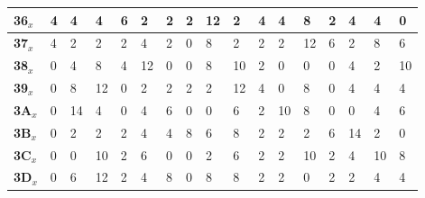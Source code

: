 \begin{longtable}[c]{|l|l|l|l|l|l|l|l|l|l|l|l|l|l|l|l|l|}
\textbf{36$_x$} & 4              & 4              & 4              & 6              & 2              & 2              & 2              & 12             & 2              & 4              & 4              & 8              & 2              & 4              & 4              & 0              \\ \hline
\textbf{37$_x$} & 4              & 2              & 2              & 2              & 4              & 2              & 0              & 8              & 2              & 2              & 2              & 12             & 6              & 2              & 8              & 6              \\ \hline
\textbf{38$_x$} & 0              & 4              & 8              & 4              & 12             & 0              & 0              & 8              & 10             & 2              & 0              & 0              & 0              & 4              & 2              & 10             \\ \hline
\textbf{39$_x$} & 0              & 8              & 12             & 0              & 2              & 2              & 2              & 2              & 12             & 4              & 0              & 8              & 0              & 4              & 4              & 4              \\ \hline
\textbf{3A$_x$} & 0              & 14             & 4              & 0              & 4              & 6              & 0              & 0              & 6              & 2              & 10             & 8              & 0              & 0              & 4              & 6              \\ \hline
\textbf{3B$_x$} & 0              & 2              & 2              & 2              & 4              & 4              & 8              & 6              & 8              & 2              & 2              & 2              & 6              & 14             & 2              & 0              \\ \hline
\textbf{3C$_x$} & 0              & 0              & 10             & 2              & 6              & 0              & 0              & 2              & 6              & 2              & 2              & 10             & 2              & 4              & 10             & 8              \\ \hline
\textbf{3D$_x$} & 0              & 6              & 12             & 2              & 4              & 8              & 0              & 8              & 8              & 2              & 2              & 0              & 2              & 2              & 4              & 4              \\ \hline

\end{longtable}
